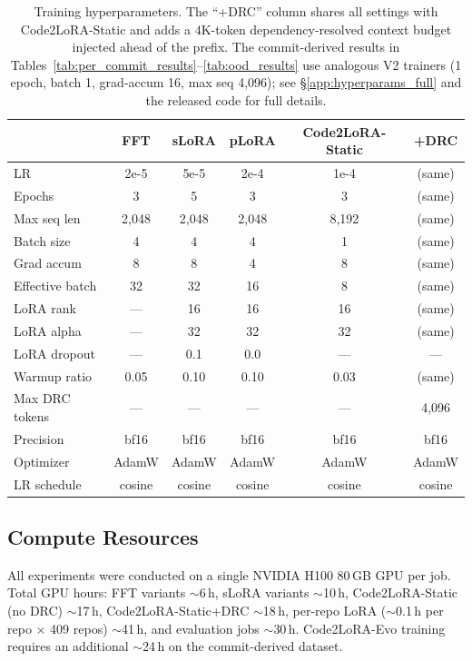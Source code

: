 \documentclass{llmxive}
\providecommand{\codelora}{Code2LoRA\xspace}
\providecommand{\codelorastatic}{\codelora-Static\xspace}
\providecommand{\codeloraevo}{\codelora-Evo\xspace}
\begin{document}
\begin{table}[t]
\begin{small}
\begin{center}
\begin{tabular}{lccccc}
\toprule
& FFT & sLoRA & pLoRA & \codelorastatic{} & +DRC \\
\midrule
LR & 2e-5 & 5e-5 & 2e-4 & 1e-4 & (same) \\
Epochs & 3 & 5 & 3 & 3 & (same) \\
Max seq len & 2,048 & 2,048 & 2,048 & 8,192 & (same) \\
Batch size & 4 & 4 & 4 & 1 & (same) \\
Grad accum & 8 & 8 & 4 & 8 & (same) \\
Effective batch & 32 & 32 & 16 & 8 & (same) \\
LoRA rank & --- & 16 & 16 & 16 & (same) \\
LoRA alpha & --- & 32 & 32 & 32 & (same) \\
LoRA dropout & --- & 0.1 & 0.0 & --- & --- \\
Warmup ratio & 0.05 & 0.10 & 0.10 & 0.03 & (same) \\
Max DRC tokens & --- & --- & --- & --- & 4,096 \\
Precision & bf16 & bf16 & bf16 & bf16 & bf16 \\
Optimizer & AdamW & AdamW & AdamW & AdamW & AdamW \\
LR schedule & cosine & cosine & cosine & cosine & cosine \\
\bottomrule
\end{tabular}


\end{center}
\end{small}
\caption{Training hyperparameters. The ``+DRC'' column shares all settings with \codelorastatic{} and adds a $4$K-token dependency-resolved context budget injected ahead of the prefix. The commit-derived results in Tables~\ref{tab:per_commit_results}--\ref{tab:ood_results} use analogous V2 trainers (1 epoch, batch 1, grad-accum 16, max seq 4,096); see \S\ref{app:hyperparams_full} and the released code for full details.}
\label{tab:training_details}
\end{table}

\subsection{Compute Resources}
\label{app:compute}

All experiments were conducted on a single NVIDIA H100 80\,GB GPU per job.
Total GPU hours: FFT variants $\sim$6\,h, sLoRA variants $\sim$10\,h, \codelorastatic{} (no DRC) $\sim$17\,h, \codelorastatic{}+DRC $\sim$18\,h, per-repo LoRA ($\sim$0.1\,h per repo $\times$ 409 repos) $\sim$41\,h, and evaluation jobs $\sim$30\,h.
\codeloraevo{} training requires an additional $\sim$24\,h on the commit-derived dataset.
\end{document}
